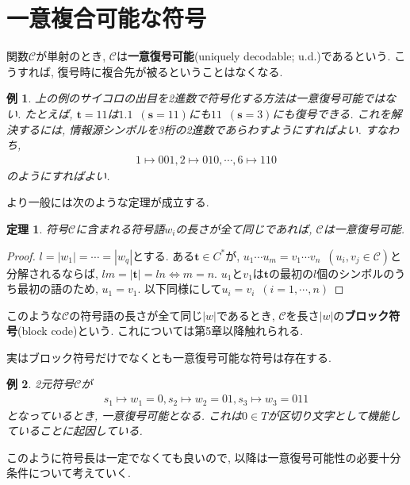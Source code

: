 \documentclass[12pt]{ltjsarticle}
\newtheorem{example}{例}
\newtheorem{theorem}{定理}
\begin{document}
\section{一意複合可能な符号}
関数$\mathcal{C}$が単射のとき, $\mathcal{C}$は\textbf{一意復号可能}(uniquely decodable; u.d.)であるという.
こうすれば, 復号時に複合先が被るということはなくなる.
\begin{example}
  上の例のサイコロの出目を2進数で符号化する方法は一意復号可能ではない.
  たとえば, $\boldsymbol{t} = 11$は$1.1 \enspace (\boldsymbol{s} = 11)$にも$11 \enspace (\boldsymbol{s} = 3)$にも復号できる.
  これを解決するには, 情報源シンボルを3桁の2進数であらわすようにすればよい.
  すなわち,
  \begin{align*}
    1 \mapsto 001, 2 \mapsto 010, \cdots, 6 \mapsto 110
  \end{align*}
  のようにすればよい.
\end{example}
\noindent
より一般には次のような定理が成立する.
\begin{screen}
  \begin{theorem}
    符号$\mathcal{C}$に含まれる符号語$w_i$の長さが全て同じであれば, $\mathcal{C}$は一意復号可能.
  \end{theorem}
\end{screen}
\begin{proof}
  $l = |w_1| = \cdots = |w_q|$とする.
  ある$\boldsymbol{t} \in C^*$が, $u_1 \cdots u_m = v_1 \cdots v_n \enspace (u_i, v_j \in \mathcal{C})$と
  分解されるならば, $lm = |\boldsymbol{t}| = ln \iff m = n$.
  $u_1$と$v_1$は$\boldsymbol{t}$の最初の$l$個のシンボルのうち最初の語のため, $u_1 = v_1$.
  以下同様にして$u_i = v_i \enspace (i = 1, \cdots, n)$
\end{proof}
\noindent
このような$\mathcal{C}$の符号語の長さが全て同じ$|w|$であるとき,
$\mathcal{C}$を長さ$|w|$の\textbf{ブロック符号}(block code)という.
これについては第5章以降触れられる.

実はブロック符号だけでなくとも一意復号可能な符号は存在する.
\begin{example}
  2元符号$\mathcal{C}$が
  \begin{align*}
    s_1 \mapsto w_1 = 0, s_2 \mapsto w_2 = 01, s_3 \mapsto w_3 = 011
  \end{align*}
  となっているとき, 一意復号可能となる.
  これは$0 \in T$が区切り文字として機能していることに起因している.
\end{example}
\noindent
このように符号長は一定でなくても良いので, 以降は一意復号可能性の必要十分条件について考えていく.
\end{document}
